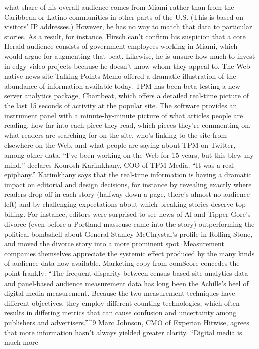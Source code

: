 what share of his overall audience comes from Miami rather than from the
Caribbean or Latino communities in other parts of the U.S. (This is based
on visitors’ IP addresses.) However, he has no way to match that data to
particular stories. As a result, for instance, Hirsch can’t confirm his
suspicion that a core Herald audience consists of government employees
working in Miami, which would argue for augmenting that beat.
Likewise, he is unsure how much to invest in edgy video projects because
he doesn’t know whom they appeal to.
The Web‐native news site Talking Points Memo offered a dramatic
illustration of the abundance of information available today. TPM has
been beta‐testing a new server analytics package, Chartbeat, which offers
a detailed real‐time picture of the last 15 seconds of activity at the popular
site. The software provides an instrument panel with a minute‐by‐minute
picture of what articles people are reading, how far into each piece they
read, which pieces they’re commenting on, what readers are searching for
on the site, who’s linking to the site from elsewhere on the Web, and what
people are saying about TPM on Twitter, among other data.
``I’ve been working on the Web for 15 years, but this blew my mind,''
declares Kourosh Karimkhany, COO of TPM Media. ``It was a real
epiphany.'' Karimkhany says that the real‐time information is having a
dramatic impact on editorial and design decisions, for instance by
revealing exactly where readers drop off in each story (halfway down a
page, there’s almost no audience left) and by challenging expectations
about which breaking stories deserve top billing. For instance, editors
were surprised to see news of Al and Tipper Gore’s divorce (even before a
Portland masseuse came into the story) outperforming the political
bombshell about General Stanley McChrystal’s profile in Rolling Stone,
and moved the divorce story into a more prominent spot.
Measurement companies themselves appreciate the systemic effect
produced by the many kinds of audience data now available. Marketing
copy from comScore concedes the point frankly:
``The frequent disparity between census‐based site analytics data
and panel‐based audience measurement data has long been the
Achille’s heel of digital media measurement. Because the two
measurement techniques have different objectives, they employ
different counting technologies, which often results in differing
metrics that can cause confusion and uncertainty among publishers
and advertisers.''^{\href{#endnotes}{9}}
Marc Johnson, CMO of Experian Hitwise, agrees that more information
hasn’t always yielded greater clarity. ``Digital media is much more
